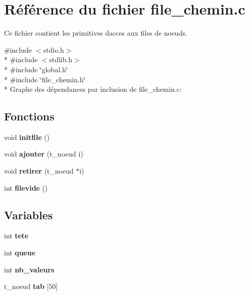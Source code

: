 \hypertarget{a00004}{}\section{Référence du fichier file\+\_\+chemin.\+c}
\label{a00004}


Ce fichier contient les primitives d\textquotesingle{}acces aux files de noeuds.  


{\ttfamily \#include $<$stdio.\+h$>$}\\*
{\ttfamily \#include $<$stdlib.\+h$>$}\\*
{\ttfamily \#include \char`\"{}global.\+h\char`\"{}}\\*
{\ttfamily \#include \char`\"{}file\+\_\+chemin.\+h\char`\"{}}\\*
Graphe des dépendances par inclusion de file\+\_\+chemin.\+c\+:
\subsection*{Fonctions}
\begin{DoxyCompactItemize}
\item 
void {\bfseries initfile} ()\hypertarget{a00004_aaf4be56c084d19f107f0da19c7c17216}{}\label{a00004_aaf4be56c084d19f107f0da19c7c17216}

\item 
void {\bfseries ajouter} (t\+\_\+noeud i)\hypertarget{a00004_a102c68ec4d3006b943c1e63ad7bcd563}{}\label{a00004_a102c68ec4d3006b943c1e63ad7bcd563}

\item 
void {\bfseries retirer} (t\+\_\+noeud $\ast$i)\hypertarget{a00004_a04ee1626a03e6867490802212829ccc5}{}\label{a00004_a04ee1626a03e6867490802212829ccc5}

\item 
int {\bfseries filevide} ()\hypertarget{a00004_a1dfabfa7163dc55b1cfa0f9317ee5bc8}{}\label{a00004_a1dfabfa7163dc55b1cfa0f9317ee5bc8}

\end{DoxyCompactItemize}
\subsection*{Variables}
\begin{DoxyCompactItemize}
\item 
int {\bfseries tete}\hypertarget{a00004_a7a7f6a8c2aff18cc12cd5a8784bb3608}{}\label{a00004_a7a7f6a8c2aff18cc12cd5a8784bb3608}

\item 
int {\bfseries queue}\hypertarget{a00004_a404442353660d7effc914ba8220ebf7f}{}\label{a00004_a404442353660d7effc914ba8220ebf7f}

\item 
int {\bfseries nb\+\_\+valeurs}\hypertarget{a00004_ac7a2a8030675ff6e2da045bba2c12fe3}{}\label{a00004_ac7a2a8030675ff6e2da045bba2c12fe3}

\item 
t\+\_\+noeud {\bfseries tab} \mbox{[}50\mbox{]}\hypertarget{a00004_ac75c08b6079dedf8a7811acd95354446}{}\label{a00004_ac75c08b6079dedf8a7811acd95354446}

\end{DoxyCompactItemize}


